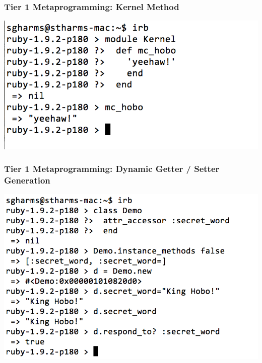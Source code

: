 \documentclass[slidestop,compress,mathserif]{beamer}
\begin{document}
\begin{frame}
	\frametitle{Tier 1 Metaprogramming:  Kernel Method}
		\includegraphics[scale=0.55]{img/kernel_method.png}
\end{frame}

\begin{frame}
	\frametitle{Tier 1 Metaprogramming:  Dynamic Getter / Setter Generation}
	\includegraphics[scale=0.45]{img/attr_demo_1.png}
\end{frame}
\end{document}
